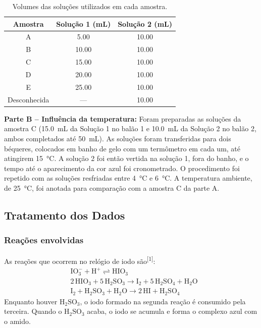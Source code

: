  \begin{table}[H]
 \centering
 \caption{Volumes das soluções utilizados em cada amostra.}
 \label{tab:volumes}
 \begin{tabular}{ccc}
 \toprule
 \textbf{Amostra} & \textbf{Solução 1 (mL)} & \textbf{Solução 2 (mL)}\\
 \midrule
 A & \num{5,00} & \num{10,00}\\
 B & \num{10,00} & \num{10,00}\\
 C & \num{15,00} & \num{10,00}\\
 D & \num{20,00} & \num{10,00}\\
 E & \num{25,00} & \num{10,00}\\
 Desconhecida & --- & \num{10,00}\\
 \bottomrule
 \end{tabular}
 \end{table}

    \textbf{Parte B -- Influência da temperatura:}
    Foram preparadas as soluções da amostra C (\SI{15,0}{mL} da Solução 1 no balão 1 e \SI{10,0}{mL} da Solução 2 no balão 2, ambos completados até \SI{50}{mL}). As soluções foram transferidas para dois béqueres, colocados em banho de gelo com um termômetro em cada um, até atingirem \SI{15}{\degreeCelsius}. A solução 2 foi então vertida na solução 1, fora do banho, e o tempo até o aparecimento da cor azul foi cronometrado. O procedimento foi repetido com as soluções resfriadas entre \SI{4}{\degreeCelsius} e \SI{6}{\degreeCelsius}. A temperatura ambiente, de \SI{25}{\degreeCelsius}, foi anotada para comparação com a amostra C da parte A.

 \subsection{Tratamento dos Dados}
 \subsubsection{Reações envolvidas}
 As reações que ocorrem no relógio de iodo são\textsuperscript{[1]}:
 \begin{align*}
    & \mathrm{IO_3^- + H^+ \rightleftharpoons HIO_3}\\
    & \mathrm{2\,HIO_3 + 5\,H_2SO_3 \longrightarrow I_2 + 5\,H_2SO_4 + H_2O}\\
    & \mathrm{I_2 + H_2SO_3 + H_2O \longrightarrow 2\,HI + H_2SO_4}
 \end{align*}
 Enquanto houver $\mathrm{H_2SO_3}$, o iodo formado na segunda reação é consumido pela terceira. Quando o $\mathrm{H_2SO_3}$ acaba, o iodo se acumula e forma o complexo azul com o amido.

